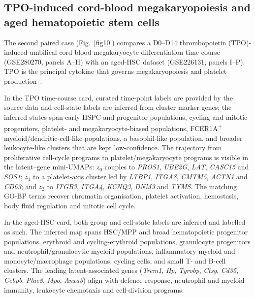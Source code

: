 \documentclass[referee, pdflatex, sn-vancouver-num]{sn-jnl}
\begin{document}
\subsection{TPO-induced cord-blood megakaryopoiesis and aged hematopoietic stem cells}\label{sec:case_ucb_hsc}

The second paired case (Fig.~\ref{fig10}) compares a D0--D14 thrombopoietin (TPO)-induced umbilical-cord-blood megakaryocyte differentiation time course (GSE280270, panels A--H) with an aged-HSC dataset (GSE226131, panels I--P). TPO is the principal cytokine that governs megakaryopoiesis and platelet production~\cite{kaushansky1994thrombopoietin,de_sauvage1994stimulation,lok1994cloning}.

In the TPO time-course card, curated time-point labels are provided by the source data and cell-state labels are inferred from cluster marker genes; the inferred states span early HSPC and progenitor populations, cycling and mitotic progenitors, platelet- and megakaryocyte-biased populations, FCER1A\textsuperscript{+} myeloid/dendritic-cell-like populations, a basophil-like population, and broader leukocyte-like clusters that are kept low-confidence. The trajectory from proliferative cell-cycle programs to platelet/megakaryocyte programs is visible in the latent--gene mini-UMAPs: $z_0$ couples to \textit{PROS1}, \textit{UBE2G}, \textit{LAT}, \textit{CASC15} and \textit{SOS1}; $z_1$ to a platelet-axis cluster led by \textit{LTBP1}, \textit{ITGA8}, \textit{CMTM5}, \textit{ACTN1} and \textit{CD63}; and $z_2$ to \textit{ITGB3}, \textit{ITGA4}, \textit{KCNQ3}, \textit{DNM3} and \textit{TYMS}. The matching GO-BP terms recover chromatin organisation, platelet activation, hemostasis, body fluid regulation and mitotic cell cycle.

In the aged-HSC card, both group and cell-state labels are inferred and labelled as such. The inferred map spans HSC/MPP and broad hematopoietic progenitor populations, erythroid and cycling-erythroid populations, granulocyte progenitors and neutrophil/granulocytic myeloid populations, inflammatory myeloid and monocyte/macrophage populations, cycling cells, and small T- and B-cell clusters. The leading latent-associated genes (\textit{Trem1}, \textit{Hp}, \textit{Tyrobp}, \textit{Ctsg}, \textit{Cd35}, \textit{Cebpb}, \textit{Plac8}, \textit{Mpo}, \textit{Anxa3}) align with defence response, neutrophil and myeloid immunity, leukocyte chemotaxis and cell-division programs.
\end{document}
